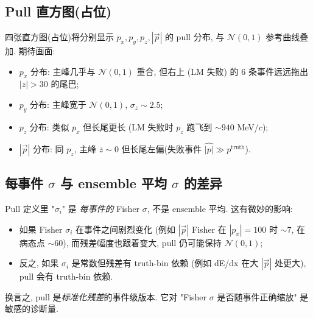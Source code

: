 \subsection{Pull 直方图(占位)}
\label{sec:partIII:pulls:histograms}


四张直方图(占位)将分别显示 $p_x, p_y, p_z, |\vec p|$ 的 pull 分布, 与 $\mathcal{N}(0, 1)$ 参考曲线叠加. 期待画面:
\begin{itemize}[nosep]
  \item $p_x$ 分布: 主峰几乎与 $\mathcal{N}(0, 1)$ 重合, 但右上 (LM 失败) 的 6 条事件远远拖出 $|z| > 30$ 的尾巴;
  \item $p_y$ 分布: 主峰宽于 $\mathcal{N}(0, 1)$, $\sigma_z \sim 2.5$;
  \item $p_z$ 分布: 类似 $p_x$ 但长尾更长 (LM 失败时 $p_z$ 跑飞到 $\sim 940$ MeV/$c$);
  \item $|\vec p|$ 分布: 同 $p_z$, 主峰 $\bar z \sim 0$ 但长尾左偏(失败事件 $\hat{|p|} \gg p^{\mathrm{truth}}$).
\end{itemize}

\subsection{每事件 $\sigma$ 与 ensemble 平均 $\sigma$ 的差异}
\label{sec:partIII:pulls:per_event_vs_ensemble}

Pull 定义里 "$\sigma_i$" 是 \emph{每事件的} Fisher $\sigma$, 不是 ensemble 平均. 这有微妙的影响:

\begin{itemize}[nosep]
  \item 如果 Fisher $\sigma_i$ 在事件之间剧烈变化 (例如 $|\vec p|$ Fisher 在 $|p_x|=100$ 时 $\sim 7$, 在病态点 $\sim 60$), 而残差幅度也跟着变大, pull 仍可能保持 $\mathcal{N}(0,1)$;
  \item 反之, 如果 $\sigma_i$ 是常数但残差有 truth-bin 依赖 (例如 dE/dx 在大 $|\vec p|$ 处更大), pull 会有 truth-bin 依赖.
\end{itemize}

换言之, pull 是\emph{标准化残差}的事件级版本. 它对 "Fisher $\sigma$ 是否随事件正确缩放" 是敏感的诊断量.

